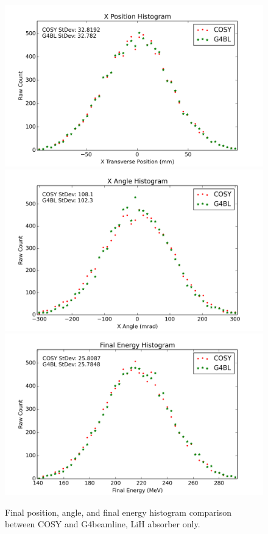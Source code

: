 \documentclass{jacow}
\begin{document}
\begin{figure}[h!]
\centering
\includegraphics[width=\columnwidth]{Figures/wedge tests (LiH)/xposition.png}
\includegraphics[width=\columnwidth]{Figures/wedge tests (LiH)/xangle.png}
\includegraphics[width=\columnwidth]{Figures/wedge tests (LiH)/energy.png}
\caption{Final position, angle, and final energy histogram comparison between COSY and G4beamline, LiH absorber only.}
\label{fig:mice_coil_absorber}
\end{figure}
\end{document}
